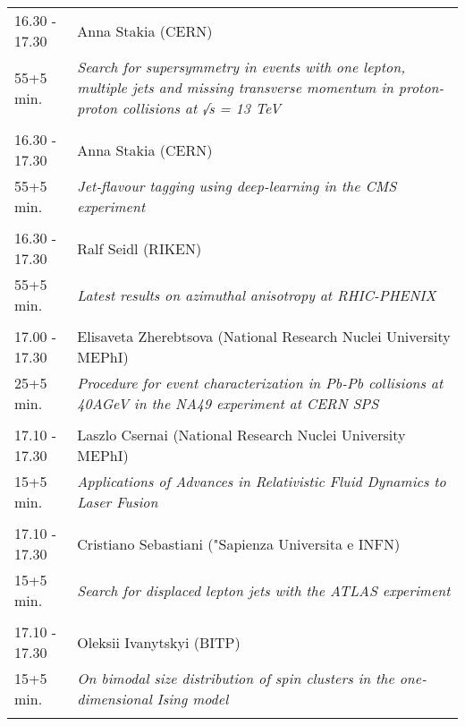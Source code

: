 \begin{longtable}{p{3cm}p{13cm}}
16.30 - 17.30 & Anna Stakia (CERN)\\ 
55+5 min. & {\it Search for supersymmetry in events with one lepton, multiple jets and missing transverse momentum in proton-proton collisions at √s = 13 TeV}\\ 
 & \\ 
16.30 - 17.30 & Anna Stakia (CERN)\\ 
55+5 min. & {\it Jet-flavour tagging using deep-learning in the CMS experiment}\\ 
 & \\ 
16.30 - 17.30 & Ralf Seidl (RIKEN)\\ 
55+5 min. & {\it Latest results on azimuthal anisotropy at RHIC-PHENIX}\\ 
 & \\ 
17.00 - 17.30 & Elisaveta Zherebtsova (National Research Nuclei University MEPhI)\\ 
25+5 min. & {\it Procedure for event characterization in Pb-Pb collisions at 40AGeV in the NA49 experiment at CERN SPS}\\ 
 & \\ 
17.10 - 17.30 & Laszlo Csernai (National Research Nuclei University MEPhI)\\ 
15+5 min. & {\it Applications of Advances in Relativistic Fluid Dynamics to Laser Fusion}\\ 
 & \\ 
17.10 - 17.30 & Cristiano Sebastiani ("Sapienza Universita e INFN)\\ 
15+5 min. & {\it Search for displaced lepton jets with the ATLAS experiment}\\ 
 & \\ 
17.10 - 17.30 & Oleksii Ivanytskyi (BITP)\\ 
15+5 min. & {\it On bimodal size distribution of spin clusters in the one-dimensional Ising model}\\ 
 & \\ 
\end{longtable}

